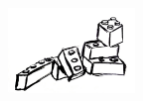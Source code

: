     \begin{figure}[b]
        \vspace{1cm}
        \centering\includegraphics[width=0.3\textwidth]{lego2.jpg}
        \vspace{1cm}
    \end{figure}








